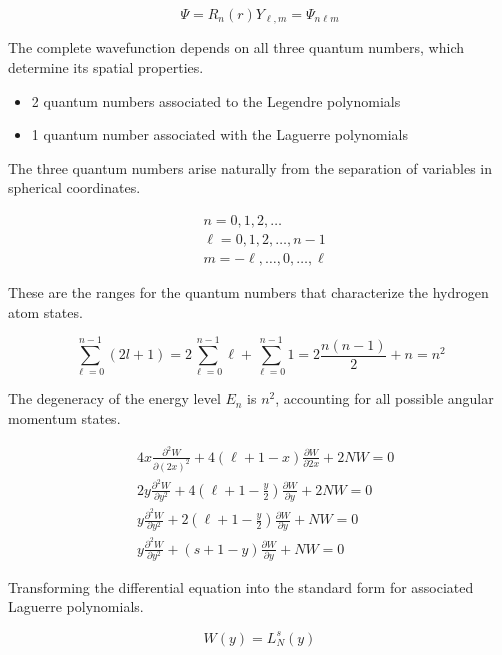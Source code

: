 \documentclass[italian]{HKNdocument}
\begin{document}
\begin{equation}
\Psi=R_{n}(r) Y_{\ell, m}=\Psi_{n \ell m}
\end{equation}

The complete wavefunction depends on all three quantum numbers, which determine its spatial properties.

\begin{itemize}
  \item 2 quantum numbers associated to the Legendre polynomials
  \item 1 quantum number associated with the Laguerre polynomials
\end{itemize}

The three quantum numbers arise naturally from the separation of variables in spherical coordinates.

\begin{align}
& n=0,1,2, \ldots \\
& \ell=0,1,2, \ldots, n-1  \\
& m=-\ell, \ldots, 0, \ldots, \ell
\end{align}

These are the ranges for the quantum numbers that characterize the hydrogen atom states.

\begin{equation}
\sum_{\ell=0}^{n-1}(2 l+1)=2 \sum_{\ell=0}^{n-1} \ell+\sum_{\ell=0}^{n-1} 1=2 \frac{n(n-1)}{2}+n=n^{2}
\end{equation}

The degeneracy of the energy level $E_n$ is $n^2$, accounting for all possible angular momentum states.

\begin{align}
& 4 x \frac{\partial^{2} W}{\partial(2 x)^{2}}+4(\ell+1-x) \frac{\partial W}{\partial 2 x}+2 N W=0 \\
& 2 y \frac{\partial^{2} W}{\partial y^{2}}+4\left(\ell+1-\frac{y}{2}\right) \frac{\partial W}{\partial y}+2 N W=0  \\
& y \frac{\partial^{2} W}{\partial y^{2}}+2\left(\ell+1-\frac{y}{2}\right) \frac{\partial W}{\partial y}+N W=0 \\
& y \frac{\partial^{2} W}{\partial y^{2}}+(s+1-y) \frac{\partial W}{\partial y}+N W=0
\end{align}

Transforming the differential equation into the standard form for associated Laguerre polynomials.

\begin{equation}
W(y)=L_{N}^{s}(y)
\end{equation}
\end{document}
